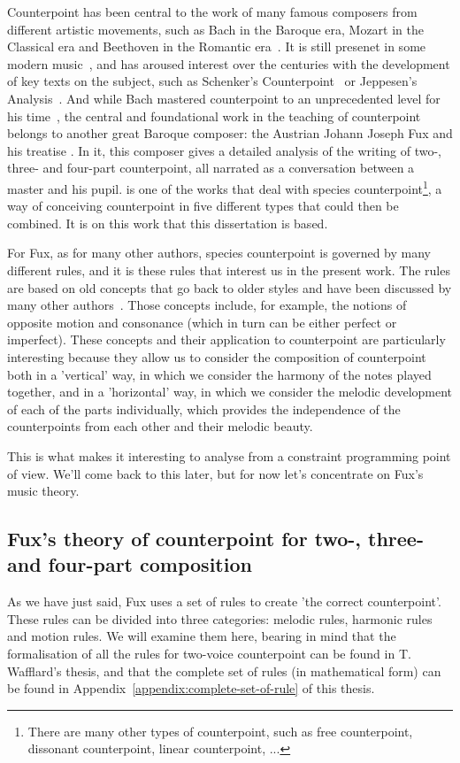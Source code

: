 Counterpoint has been central to the work of many famous composers from different artistic movements, such as Bach in the Baroque era, Mozart in the Classical era and Beethoven in the Romantic era~\cite{kramer1987gradus}. It is still presenet in some modern music~\cite{altozano2017contrapunto}, and has aroused interest over the centuries with the development of key texts on the subject, such as Schenker's Counterpoint~\cite{schenker1906} or Jeppesen's Analysis~\cite{jeppesen1960}. And while Bach mastered counterpoint to an unprecedented level for his time~\cite{yearsley2002}, the central and foundational work in the teaching of counterpoint belongs to another great Baroque composer: the Austrian Johann Joseph Fux and his treatise \gap. In it, this composer gives a detailed analysis of the writing of two-, three- and four-part counterpoint, all narrated as a conversation between a master and his pupil. \gaps is one of the works that deal with species counterpoint\footnote{There are many other types of counterpoint, such as free counterpoint, dissonant counterpoint, linear counterpoint, ...}, a way of conceiving counterpoint in five different types that could then be combined. It is on this work that this dissertation is based.


For Fux, as for many other authors, species counterpoint is governed by many different rules, and it is these rules that interest us in the present work. The rules are based on old concepts that go back to older styles and have been discussed by many other authors~\cite{crocker1962}. Those concepts include, for example, the notions of opposite motion and consonance (which in turn can be either perfect or imperfect). These concepts and their application to counterpoint are particularly interesting because they allow us to consider the composition of counterpoint both in a 'vertical' way, in which we consider the harmony of the notes played together, and in a 'horizontal' way, in which we consider the melodic development of each of the parts individually, which provides the independence of the counterpoints from each other and their melodic beauty.

This is what makes it interesting to analyse from a constraint programming point of view. We'll come back to this later, but for now let's concentrate on Fux's music theory.

\subsection{Fux's theory of counterpoint for two-, three- and four-part composition}
As we have just said, Fux uses a set of rules to create 'the correct counterpoint'. These rules can be divided into three categories: melodic rules, harmonic rules and motion rules. We will examine them here, bearing in mind that the formalisation of all the rules for two-voice counterpoint can be found in T. Wafflard's thesis, and that the complete set of rules (in mathematical form) can be found in Appendix~\ref{appendix:complete-set-of-rule} of this thesis.

